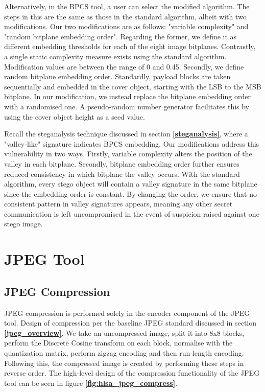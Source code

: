 \documentclass{l4proj}
\begin{document}
Alternatively, in the BPCS tool, a user can select the modified algorithm. The steps in this are the same as those in the standard algorithm, albeit with two modifications. Our two modifications are as follows: "variable complexity" and "random bitplane embedding order". Regarding the former, we define it as different embedding thresholds for each of the eight image bitplanes. Contrastly, a single static complexity measure exists using the standard algorithm. Modification values are between the range of 0 and 0.45. Secondly, we define random bitplane embedding order. Standardly, payload blocks are taken sequentially and embedded in the cover object, starting with the LSB to the MSB bitplane.  In our modification, we instead replace the bitplane embedding order with a randomised one. A pseudo-random number generator facilitates this by using the cover object height as a seed value.

Recall the steganalysis technique discussed in section \textbf{\ref{steganalysis}}, where a "valley-like" signature indicates BPCS embedding. Our modifications address this vulnerability in two ways. Firstly, variable complexity alters the position of the valley in each bitplane. Secondly, bitplane embedding order further ensures reduced consistency in which bitplane the valley occurs. With the standard algorithm, every stego object will contain a valley signature in the same bitplane since the embedding order is constant. By changing the order, we ensure that no consistent pattern in valley signatures appears, meaning any other secret communication is left uncompromised in the event of suspicion raised against one stego image.

\section{JPEG Tool}\label{jpeg_design}

\subsection{JPEG Compression}

JPEG compression is performed solely in the encoder component of the JPEG tool. Design of compression per the baseline JPEG standard discussed in section \textbf{\ref{jpeg_overview}}. We take an uncompressed image, split it into 8x8 blocks, perform the Discrete Cosine transform on each block, normalise with the quantization matrix, perform zigzag encoding and then run-length encoding. Following this, the compressed image is created by performing these steps in reverse order. The high-level design of the compression functionality of the JPEG tool can be seen in figure \textbf{\ref{fig:hlsa_jpeg_compress}}.
\end{document}

